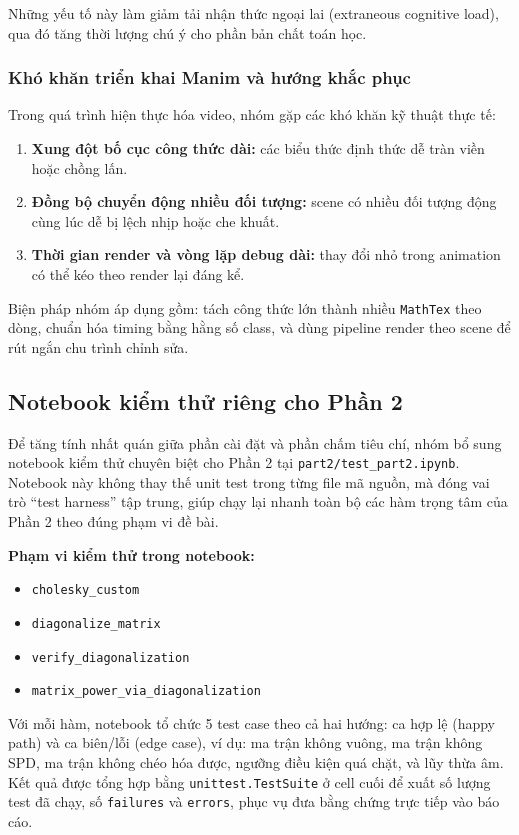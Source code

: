\documentclass[a4paper]{article}
\begin{document}
Những yếu tố này làm giảm tải nhận thức ngoại lai (extraneous cognitive load), qua đó tăng thời lượng chú ý cho phần bản chất toán học.

\subsubsection{Khó khăn triển khai Manim và hướng khắc phục}

Trong quá trình hiện thực hóa video, nhóm gặp các khó khăn kỹ thuật thực tế:
\begin{enumerate}
    \item \textbf{Xung đột bố cục công thức dài:} các biểu thức định thức dễ tràn viền hoặc chồng lấn.
    \item \textbf{Đồng bộ chuyển động nhiều đối tượng:} scene có nhiều đối tượng động cùng lúc dễ bị lệch nhịp hoặc che khuất.
    \item \textbf{Thời gian render và vòng lặp debug dài:} thay đổi nhỏ trong animation có thể kéo theo render lại đáng kể.
\end{enumerate}

Biện pháp nhóm áp dụng gồm: tách công thức lớn thành nhiều \texttt{MathTex} theo dòng, chuẩn hóa timing bằng hằng số class, và dùng pipeline render theo scene để rút ngắn chu trình chỉnh sửa.

\subsection{Notebook kiểm thử riêng cho Phần 2}

Để tăng tính nhất quán giữa phần cài đặt và phần chấm tiêu chí, nhóm bổ sung notebook kiểm thử chuyên biệt cho Phần 2 tại \texttt{part2/test\_part2.ipynb}. Notebook này không thay thế unit test trong từng file mã nguồn, mà đóng vai trò ``test harness'' tập trung, giúp chạy lại nhanh toàn bộ các hàm trọng tâm của Phần 2 theo đúng phạm vi đề bài.

\textbf{Phạm vi kiểm thử trong notebook:}
\begin{itemize}
    \item \texttt{cholesky\_custom}
    \item \texttt{diagonalize\_matrix}
    \item \texttt{verify\_diagonalization}
    \item \texttt{matrix\_power\_via\_diagonalization}
\end{itemize}

Với mỗi hàm, notebook tổ chức 5 test case theo cả hai hướng: ca hợp lệ (happy path) và ca biên/lỗi (edge case), ví dụ: ma trận không vuông, ma trận không SPD, ma trận không chéo hóa được, ngưỡng điều kiện quá chặt, và lũy thừa âm. Kết quả được tổng hợp bằng \texttt{unittest.TestSuite} ở cell cuối để xuất số lượng test đã chạy, số \texttt{failures} và \texttt{errors}, phục vụ đưa bằng chứng trực tiếp vào báo cáo.
\end{document}
